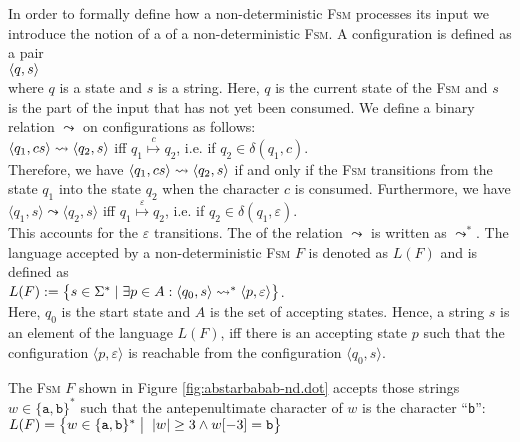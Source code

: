 In order to formally define how a non-deterministic \textsc{Fsm} processes its input we introduce the notion of a
  of a non-deterministic \textsc{Fsm}.  A configuration
is defined as a pair
\\[0.2cm]
\hspace*{1.3cm}
$\pair(q, s)$
\\[0.2cm]
where  $q$ is a state and $s$ is a  string.  Here, $q$ is the current state of
the \textsc{Fsm} and $s$ is the part of the input that has not yet been
consumed.  We define a binary relation
$\leadsto$ \index{$\leadsto$} on configurations as follows:
\\[0.2cm]
\hspace*{1.3cm}
$\pair(q_1, cs) \leadsto \pair(q_2, s)$ \quad iff \quad $q_1 \stackrel{c}{\mapsto} q_2$, \quad i.e. if $q_2 \in\delta(q_1, c)$.
\\[0.2cm]
Therefore, we have $\pair(q_1,cs) \leadsto \pair(q_2, s)$ if and only
if the \textsc{Fsm} transitions from the state
$q_1$ into the state $q_2$ when the character $c$ is consumed.
Furthermore, we have
\\[0.2cm]
\hspace*{1.3cm}
$\langle q_1, s \rangle \leadsto \langle q_2, s \rangle$ \quad iff \quad $q_1 \stackrel{\varepsilon}{\mapsto}
q_2$, \quad i.e. if $q_2 \in \delta(q_1, \varepsilon)$.
\\[0.2cm]
This accounts for the $\varepsilon$ transitions.  The
 of the relation $\leadsto$ is written as $\leadsto^*$.
The language accepted by a non-deterministic \textsc{Fsm} $F$ is
denoted as $L(F)$ and is defined as
\\[0.2cm]
\hspace*{1.3cm}
$L(F) := \bigl\{ s \in \Sigma^* \mid  
                 \exists p \in A : \pair(q_0,s) \leadsto^* \pair(p,\varepsilon) \bigr\}$.
\\[0.2cm]
Here,  $q_0$ is the  start state and $A$ is the set of accepting
states.  Hence, a string  $s$ is an element of the language  $L(F)$,  
iff there is an accepting state $p$ such that the configuration $\langle p, \varepsilon \rangle$ is reachable from the configuration $\langle q_0, s \rangle$.

\exampleEng 
The \textsc{Fsm} $F$ shown in Figure \ref{fig:abstarbabab-nd.dot} accepts
those strings $w \in \{ \mathtt{a}, \mathtt{b} \}^*$ such that the
antepenultimate character of $w$ is  the character ``\texttt{b}'':
\\[0.2cm]
\hspace*{1.3cm}
$L(F) = \bigl\{ w \in \{ \mathtt{a}, \mathtt{b} \}^* \bigm|\; |w| \geq 3 \wedge w[-3] = \mathtt{b} \bigr\}$
 \eox
\vspace*{0.3cm}

